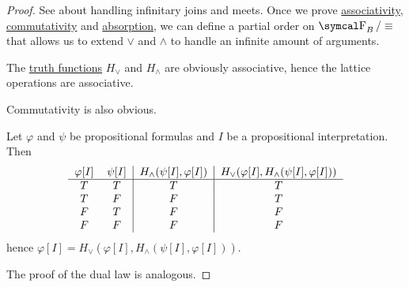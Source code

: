 \begin{proof}
  See  about handling infinitary joins and meets. Once we prove \hyperref[def:magma/associative]{associativity}, \hyperref[def:magma/commutative]{commutativity} and \hyperref[def:binary_lattice_operations/absorption]{absorption}, we can define a partial order on \( \CF_B / \equiv \) that allows us to extend \( \vee \) and \( \wedge \) to handle an infinite amount of arguments.

   The \hyperref[def:propositional_truth_functions]{truth functions} \( H_\vee \) and \( H_\wedge \) are obviously associative, hence the lattice operations are associative.

   Commutativity is also obvious.

   Let \( \varphi \) and \( \psi \) be propositional formulas and \( I \) be a propositional interpretation. Then
  \begin{equation*}
    \begin{tabular}{c c | c | c}
      \( \varphi[I] \) & \( \psi[I] \) & \( H_\wedge(\psi[I], \varphi[I]) \) & \( H_\vee(\varphi[I], H_\wedge(\psi[I], \varphi[I])) \) \\
      \hline
      \( T \)          & \( T \)       & \( T \)                             & \( T \)                                                 \\
      \( T \)          & \( F \)       & \( F \)                             & \( T \)                                                 \\
      \( F \)          & \( T \)       & \( F \)                             & \( F \)                                                 \\
      \( F \)          & \( F \)       & \( F \)                             & \( F \)
    \end{tabular}
  \end{equation*}
  hence \( \varphi[I] = H_\vee(\varphi[I], H_\wedge(\psi[I], \varphi[I])) \).

  The proof of the dual law is analogous.


\end{proof}
